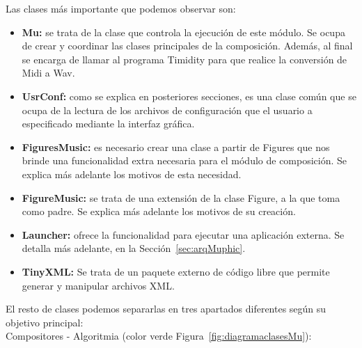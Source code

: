 Las clases más importante que podemos observar son:\\

\begin{itemize}

	\item \textbf{Mu:} se trata de la clase que controla la ejecución de este módulo. Se ocupa de crear y coordinar las clases principales de la composición. Además, al final se encarga de llamar al programa Timidity para que realice la conversión de Midi a Wav.
	
	\item \textbf{UsrConf:} como se explica en posteriores secciones, es una clase común que se ocupa de la lectura de los archivos de configuración que el usuario a especificado mediante la interfaz gráfica.
	
	\item \textbf{FiguresMusic:} es necesario crear una clase a partir de Figures que nos brinde una funcionalidad extra necesaria para el módulo de composición. Se explica más adelante los motivos de esta necesidad.
	
	\item \textbf{FigureMusic:} se trata de una extensión de la clase Figure, a la que toma como padre. Se explica más adelante los motivos de su creación.

	\item \textbf{Launcher:} ofrece la funcionalidad para ejecutar una aplicación externa. Se detalla más adelante, en la Sección~\ref{sec:arqMuphic}.

	\item \textbf{TinyXML:} Se trata de un paquete externo de código libre que permite generar y manipular archivos XML.

\end{itemize}

El resto de clases podemos separarlas en tres apartados diferentes según su objetivo principal:\\

Compositores - Algoritmia (color verde Figura~\ref{fig:diagramaclasesMu}):

